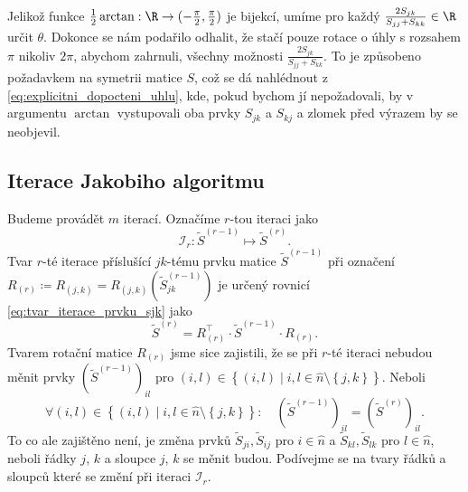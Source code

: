 Jelikož funkce $\frac{1}{2}\arctan: \R \to (-\frac{\pi}{2},\frac{\pi}{2})$ je bijekcí, umíme pro každý $\frac{2S_{jk}}{S_{jj} + S_{kk}} \in \R$ určit $\theta$. Dokonce se nám podařilo odhalit, že stačí pouze rotace o úhly s rozsahem $\pi$ nikoliv $2\pi$, abychom zahrnuli, všechny možnosti $\frac{2S_{jk}}{S_{jj} + S_{kk}}$. To je způsobeno požadavkem na symetrii matice $S$, což se dá nahlédnout z \ref{eq:explicitni_dopocteni_uhlu}, kde, pokud bychom jí nepožadovali, by v argumentu $\arctan$ vystupovali oba prvky $S_{jk}$ a $S_{kj}$ a zlomek před výrazem by se neobjevil.


\subsection{Iterace Jakobiho algoritmu}%
\label{sec:iterace_jakobiho_algoritmu}
Budeme provádět $m$ iterací. Označíme $r$-tou iteraci jako
\[
	\mathscr{I}_{r}: \tilde{S}^{(r-1)} \mapsto \tilde{S}^{(r)}.
\]
Tvar $r$-té iterace příslušící $jk$-tému prvku matice $\tilde{S}^{(r-1)}$ při označení $R_{(r)}\coloneqq R_{(j,k)} = R_{(j,k)}\left(  \tilde{S}^{(r-1)}_{jk} \right)$ je určený rovnicí \ref{eq:tvar_iterace_prvku_sjk} jako
\[
	\tilde{S}^{(r)} = R_{(r)}^{\top}\cdot \tilde{S}^{(r-1)} \cdot R_{(r)}.
\]
Tvarem rotační matice $R_{(r)}$ jsme sice zajistili, že se při $r$-té iteraci nebudou měnit prvky $\left(\tilde{S}^{(r-1)}\right)_{il}$ pro $(i,l) \in \left\{ (i,l) \mid i,l \in \hat{n} \setminus  \left\{ j,k \right\}  \right\} $. Neboli
\[
	\forall(i,l) \in \left\{ (i,l) \mid i,l \in \hat{n} \setminus  \left\{ j,k \right\}  \right\}: \quad \left( \tilde{S}^{(r-1)} \right)_{il} = \left( \tilde{S}^{(r)} \right)_{il}
	.\]
To co ale zajištěno není, je změna prvků $\tilde{S}_{ji}, \tilde{S}_{ij}$ pro $i \in \hat{n}$ a $\tilde{S}_{kl}, \tilde{S}_{lk}$ pro $l \in \hat{n}$,
neboli řádky $j$, $k$ a sloupce $j$,  $k$ se měnit budou. Podívejme se na tvary řádků a sloupců které se změní při iteraci $\mathscr{I}_{r}$.

